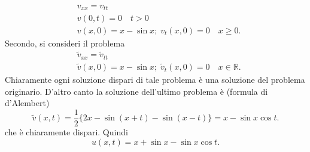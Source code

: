 \documentclass{report}
\newcommand\R{{\mathbb R}}
\begin{document}
\begin{enumerate}
\[
\begin{split}
&v_{xx}=v_{tt}\\
&v(0,t)=0 \quad t>0\\
&v(x,0)=x-\sin x;\;v_t(x,0)=0 \quad x\geq 0.
\end{split}
\]
Secondo, si consideri il problema
\[
\begin{split}
&\tilde v_{xx}=\tilde v_{tt}\\
&\tilde v(x,0)=x-\sin x;\;\tilde v_t(x,0)=0 \quad x\in\R.
\end{split}
\]
Chiaramente ogni soluzione dispari di tale problema \`e una solu\-zione del
problema originario.
D'altro canto la soluzione dell'ulti\-mo problema \`e (formula di d'Alembert)
\[
\tilde v(x,t)=\frac 12\{ 2x-\sin (x+t)-\sin(x-t)\}=x-\sin x\cos t.
\]
che \`e chiaramente dispari.  Quindi
\[
u(x,t)=x+\sin x-\sin x\cos t.
\]
\end{enumerate}
\end{document}
